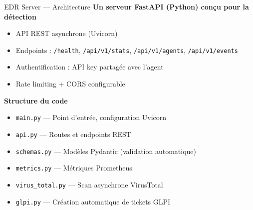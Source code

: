 \documentclass[xcolor=dvipsnames, aspectratio=169, 10pt]{beamer}
\newcommand{\bitem}{\item[$\bullet$]}
\begin{document}
\begin{frame}{EDR Server — Architecture}
  \textbf{Un serveur FastAPI (Python) conçu pour la détection}
  \begin{itemize}
    \bitem API REST asynchrone (Uvicorn)
    \bitem Endpoints : \texttt{/health}, \texttt{/api/v1/stats}, \texttt{/api/v1/agents}, \texttt{/api/v1/events}
    \bitem Authentification : API key partagée avec l'agent
    \bitem Rate limiting + CORS configurable
  \end{itemize}
  \vspace{0.3cm}
  \textbf{Structure du code}
  \begin{itemize}
    \bitem \texttt{main.py} — Point d'entrée, configuration Uvicorn
    \bitem \texttt{api.py} — Routes et endpoints REST
    \bitem \texttt{schemas.py} — Modèles Pydantic (validation automatique)
    \bitem \texttt{metrics.py} — Métriques Prometheus
    \bitem \texttt{virus\_total.py} — Scan asynchrone VirusTotal
    \bitem \texttt{glpi.py} — Création automatique de tickets GLPI
  \end{itemize}
\end{frame}
\end{document}
